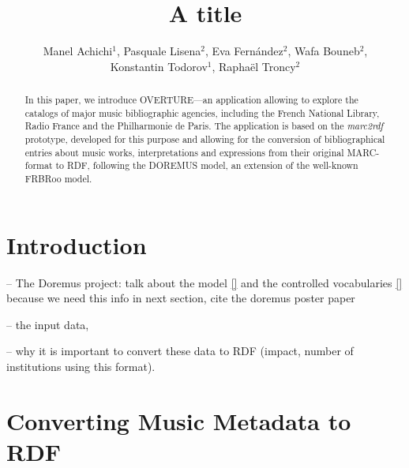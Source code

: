 \documentclass[runningheads,a4paper]{llncs}
\begin{document}
\title{A title}


\author{Manel Achichi$^1$, Pasquale Lisena$^2$, Eva Fern\'{a}ndez$^2$, Wafa Bouneb$^2$, \\ Konstantin Todorov$^1$, Rapha\"{e}l Troncy$^2$}

\maketitle


\begin{abstract}
In this paper, we introduce OVERTURE---an application allowing to explore the catalogs of major music bibliographic agencies, including the French National Library, Radio France and the Philharmonie de Paris. The application is based on the {\it marc2rdf} prototype, developed for this purpose and allowing for the conversion of bibliographical entries about music works, interpretations and expressions from their original MARC-format to RDF, following the DOREMUS model, an extension of the well-known FRBRoo model.
\end{abstract}


\section{Introduction}
\label{sec:introduction}

-- The Doremus project: talk about the model \ref{} and the controlled vocabularies \ref{} because we need this info in next section, cite the doremus poster paper \cite{achichi2015doremus}

-- the input data,

-- why it is important to convert these data to RDF (impact, number of institutions using this format).


\section{Converting Music Metadata to RDF}
\label{sec:conversion}
\end{document}
